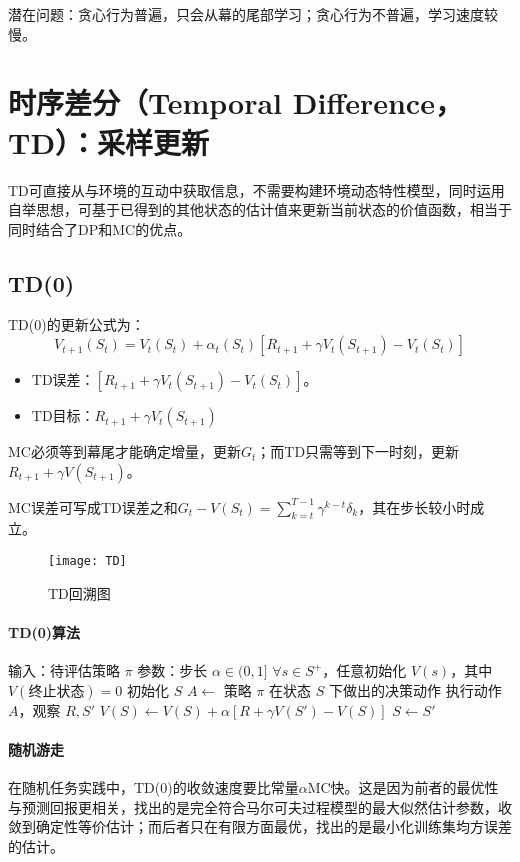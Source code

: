 \documentclass[
12pt, %
a4paper, 
oneside, %
headinclude,footinclude, %
]{scrartcl}
\begin{document}
潜在问题：贪心行为普遍，只会从幕的尾部学习；贪心行为不普遍，学习速度较慢。
\section{时序差分（Temporal Difference，TD）：采样更新}
TD可直接从与环境的互动中获取信息，不需要构建环境动态特性模型，同时运用自举思想，可基于已得到的其他状态的估计值来更新当前状态的价值函数，相当于同时结合了DP和MC的优点。
\subsection{TD(0)}
TD(0)的更新公式为：
$$
V_{t + 1}(S_t) = V_t(S_t) + \alpha_t(S_t)[R_{t + 1} + \gamma V_t(S_{t + 1}) - V_t(S_t)]
$$
\begin{itemize}
\item TD误差：$ [R_{t + 1} + \gamma V_t(S_{t + 1}) - V_t(S_t)] $。
\item TD目标：$ R_{t + 1} + \gamma V_t(S_{t + 1}) $
\end{itemize}

MC必须等到幕尾才能确定增量，更新$ G_t $；而TD只需等到下一时刻，更新$ R_{t + 1} + \gamma V(S_{t + 1}) $。

MC误差可写成TD误差之和$ G_t - V(S_t) = \sum_{k = t}^{T - 1} \gamma^{k - t} \delta_k $，其在步长较小时成立。

\begin{figure}[H]
\centering
\texttt{[image: TD]}
\caption[TD回溯图]{TD回溯图}
\end{figure}
\paragraph{TD(0)算法}
\begin{myalgorithm}[TD(0)算法]
\State 输入：待评估策略 $\pi$
\State 参数：步长 $\alpha \in (0,1]$
\State $\forall s \in S^+$，任意初始化 $V(s)$，其中 $V(\text{终止状态}) = 0$
    \State 初始化 $S$
        \State $A \gets$ 策略 $\pi$ 在状态 $S$ 下做出的决策动作
        \State 执行动作 $A$，观察 $R, S'$
        \State $V(S) \gets V(S) + \alpha[R + \gamma V(S') - V(S)]$
        \State $S \gets S'$
    \EndWhile
\EndFor
\end{myalgorithm}
\paragraph{随机游走}
在随机任务实践中，TD(0)的收敛速度要比常量$ \alpha $MC快。这是因为前者的最优性与预测回报更相关，找出的是完全符合马尔可夫过程模型的最大似然估计参数，收敛到确定性等价估计；而后者只在有限方面最优，找出的是最小化训练集均方误差的估计。
\end{document}
